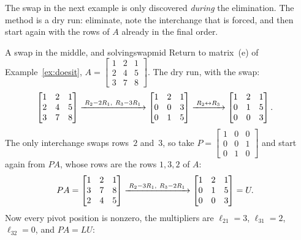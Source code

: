 \documentclass[11pt]{article}
\begin{document}
The swap in the next example is only discovered \emph{during} the elimination. The method is a dry run: eliminate, note the interchange that is forced, and then start again with the rows of $A$ already in the final order.

\begin{exmp}{A swap in the middle, and solving}{swapmid}
Return to matrix~(e) of Example~\ref{ex:doesit}, $A=\begin{bmatrix}1&2&1\\2&4&5\\3&7&8\end{bmatrix}$. The dry run, with the swap:
\begin{align*}
\begin{bmatrix}1&2&1\\2&4&5\\3&7&8\end{bmatrix}
&\xrightarrow{\;R_2-2R_1,\ R_3-3R_1\;}
\begin{bmatrix}1&2&1\\0&0&3\\0&1&5\end{bmatrix}
\xrightarrow{\;R_2\leftrightarrow R_3\;}
\begin{bmatrix}1&2&1\\0&1&5\\0&0&3\end{bmatrix}.
\end{align*}
The only interchange swaps rows~$2$ and~$3$, so take $P=\begin{bmatrix}1&0&0\\0&0&1\\0&1&0\end{bmatrix}$ and start again from $PA$, whose rows are the rows $1,3,2$ of $A$:
\begin{align*}
PA=\begin{bmatrix}1&2&1\\3&7&8\\2&4&5\end{bmatrix}
&\xrightarrow{\;R_2-3R_1,\ R_3-2R_1\;}
\begin{bmatrix}1&2&1\\0&1&5\\0&0&3\end{bmatrix}=U .
\end{align*}
Now every pivot position is nonzero, the multipliers are $\ell_{21}=3$, $\ell_{31}=2$, $\ell_{32}=0$, and $PA=LU$:
\[
\]
\end{exmp}
\end{document}
